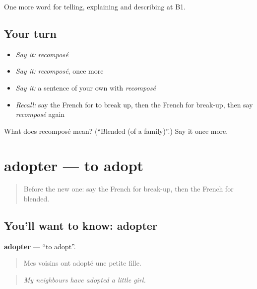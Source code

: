 \begin{grammarlens}[title={What you've built}]
One more word for telling, explaining and describing at B1.
\end{grammarlens}

\subsection*{Your turn}
\begin{itemize}
\raggedright
  \item \emph{Say it:} \emph{recomposé}
  \item \emph{Say it:} \emph{recomposé}, once more
  \item \emph{Say it:} a sentence of your own with \emph{recomposé}
  \item \emph{Recall:} say the French for to break up, then the French for break-up, then say \emph{recomposé} again
\end{itemize}

\begin{tcolorbox}[breakable,colback=teal!4,colframe=teal!35!black,title={Before you move on}]
What does recomposé mean? (\textquotedblleft{}Blended (of a family)\textquotedblright{}.) Say it once more.
\end{tcolorbox}
\section[adopter]{adopter — to adopt}

\label{lesson:FR-C492-adopter}



\begin{quote}
Before the new one: say the French for break-up, then the French for blended.
\end{quote}

\subsection*{You'll want to know: adopter}
\textbf{adopter} — \textquotedblleft{}to adopt\textquotedblright{}.

\begin{quote}
Mes voisins ont adopté une petite fille.
\end{quote}

\begin{quote}
\emph{My neighbours have adopted a little girl.}
\end{quote}

